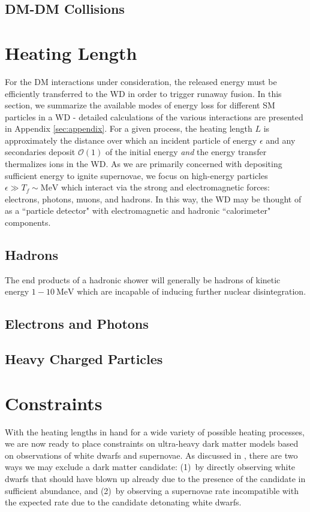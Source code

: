\documentclass[twocolumn,showpacs,preprintnumbers,amsmath,amssymb,prd]{revtex4}
\newcommand{\OO}{\mathcal{O}}
\begin{document}
\subsection{DM-DM Collisions}

\section{Heating Length}
\label{sec:heatinglength}
For the DM interactions under consideration, the released energy must be efficiently transferred to the WD in order to trigger runaway fusion. In this section, we summarize the available modes of energy loss for different SM particles in a WD - detailed calculations of the various interactions are presented in Appendix \ref{sec:appendix}. For a given process, the heating length $L$ is approximately the distance over which an incident particle of energy $\epsilon$ and any secondaries deposit $\OO(1)$ of the initial energy \emph{and} the energy transfer thermalizes ions in the WD. As we are primarily concerned with depositing sufficient energy to ignite supernovae, we focus on high-energy particles $\epsilon \gg T_f \sim \text{MeV}$ which interact via the strong and electromagnetic forces: electrons, photons, muons, and hadrons. In this way, the WD may be thought of as a ``particle detector" with electromagnetic and hadronic ``calorimeter" components.

\subsection{Hadrons}

The end products of a hadronic shower will generally be hadrons of kinetic energy $1-10 ~\text{MeV}$ which are incapable of inducing further nuclear disintegration.

\subsection{Electrons and Photons}

\subsection{Heavy Charged Particles}


\section{Constraints}
\label{sec:Constraints}

With the heating lengths in hand for a wide variety of possible heating processes, we are now ready to place constraints on ultra-heavy dark matter models based on observations of white dwarfs and supernovae. As discussed in \cite{Graham:2015apa}, there are two ways we may exclude a dark matter candidate: (1)~by directly observing white dwarfs that should have blown up already due to the presence of the candidate in sufficient abundance, and (2)~by observing a supernovae rate incompatible with the expected rate due to the candidate detonating white dwarfs. 
\end{document}
